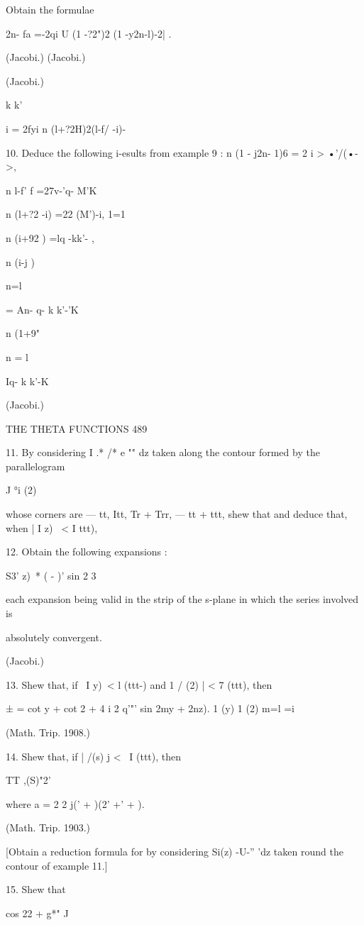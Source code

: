 Obtain the formulae

2n- fa =-2qi U (1 -?2")2 (1 -y2n-l)-2| .

(Jacobi.) (Jacobi.)

(Jacobi.)

k k'

i = 2fyi n (l+?2H)2(l-f/ -i)-

10. Deduce the following i-esults from example 9 : n (1 - j2n- 1)6 = 2
i > •'/(•->,

n l-f' f =27v-'q- M'K\

n (l+?2 -i) =22 (M')-i, 1=1

n (i+92 ) =lq -kk'- ,

n (i-j )

n=l

= An- q- k k'-'K\

n (1+9"

n = l

Iq- k k'-K

(Jacobi.)

THE THETA FUNCTIONS 489

11. By considering I .* /* e "" dz taken along the contour formed by
the parallelogram

J °i (2)

whose corners are — tt, Itt, Tr + Trr, — tt + ttt, shew that and
deduce that, when | I z) \ < I ttt),

12. Obtain the following expansions :

S3' z)\ * ( - )' sin 2 3

each expansion being valid in the strip of the s-plane in which the
series involved is

absolutely convergent.

(Jacobi.)

13. Shew that, if \ I y)\ < l (ttt-) and 1 / (2) | < 7 (ttt), then

  ± = cot y + cot 2 + 4 i 2 q'"' sin 2my + 2nz). 1 (y) 1 (2) m=l =i

(Math. Trip. 1908.)

14. Shew that, if | /(s) j < \ I (ttt), then

TT ,(S)"2'

where a = 2 2 j(' + )(2' +' + ).

(Math. Trip. 1903.)

[Obtain a reduction formula for by considering Si(z) -U-'' 'dz taken
round the contour of example 11.]

15. Shew that

cos 22 + g*" J

